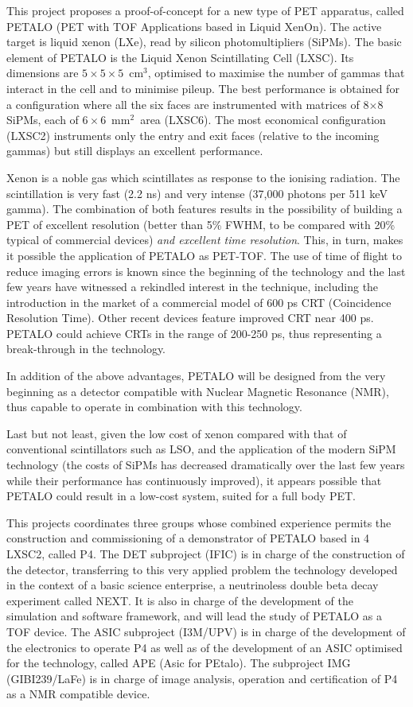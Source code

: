 This project proposes a proof-of-concept for a new type of PET apparatus, called
PETALO (PET with TOF Applications based in Liquid XenOn). The active target is liquid xenon (LXe), read by silicon photomultipliers (SiPMs). The basic element of PETALO is the Liquid Xenon Scintillating Cell (LXSC). Its dimensions are $5\times 5 \times 5$~cm$^3$, optimised to maximise the number of gammas that interact in the cell and to minimise pileup. The best performance is obtained for a configuration where all the six faces are instrumented with matrices of  8$\times$8 SiPMs, each of $6 \times 6$~mm$^2$~area (LXSC6). The most economical configuration (LXSC2) instruments only the entry and exit faces (relative to the incoming gammas) but still displays an excellent performance. 

Xenon is a noble gas which scintillates as response to the ionising radiation. The scintillation is very fast (2.2 ns) and very intense (37,000 photons per 511 keV gamma). The combination of both features results in the possibility of building a PET of excellent resolution (better than 5\% FWHM, to be compared with 20\% typical of commercial devices) {\em and excellent time resolution}. This, in turn, makes it possible the application of PETALO as PET-TOF. The use of time of flight to reduce imaging errors is known since the beginning of the technology and the last few years have witnessed a rekindled interest in the technique, including the introduction in the market of a commercial model of 600 ps CRT (Coincidence Resolution Time). Other recent devices feature improved CRT near 400 ps. PETALO could achieve CRTs in the range of 200-250 ps, thus representing a break-through in the technology.  

In addition of the above advantages, PETALO will be designed from the very beginning as a detector compatible with Nuclear Magnetic Resonance (NMR), thus capable to operate in combination with this technology. 

Last but not least, given the low cost of xenon compared with that of conventional scintillators such as LSO, and the application of the modern SiPM technology (the costs of SiPMs has decreased dramatically over the last few years while their performance has continuously improved), it appears possible that PETALO could result in a low-cost system, suited for a full body PET.

This projects coordinates three groups whose combined experience permits the construction and commissioning of a demonstrator of PETALO based in 4 LXSC2, called P4. The DET subproject (IFIC) is in charge of the construction  of the detector, transferring to this very applied problem the technology developed in the context of a basic science enterprise, a neutrinoless double beta decay experiment called NEXT. It is also in charge of the development of the simulation and software framework, and will lead the study of PETALO as a TOF device. The ASIC subproject (I3M/UPV) is in charge of the development of the electronics to operate P4 as well as of the development of an ASIC optimised for the technology, called APE (Asic for PEtalo). The subproject IMG 
(GIBI239/LaFe) is in charge of image analysis, operation and certification of P4 as a NMR compatible device. 
 



